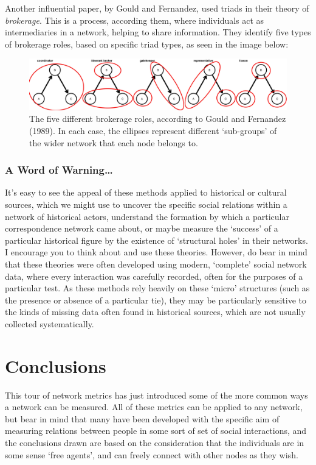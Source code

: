 \documentclass[
]{book}
\begin{document}
Another influential paper, by Gould and Fernandez, used triads in their theory of \emph{brokerage}. This is a process, according them, where individuals act as intermediaries in a network, helping to share information. They identify five types of brokerage roles, based on specific triad types, as seen in the image below:

\begin{figure}
\centering
\includegraphics{images/brokerage_custom.jpg}
\caption{The five different brokerage roles, according to Gould and Fernandez (1989). In each case, the ellipses represent different `sub-groups' of the wider network that each node belongs to.}
\end{figure}

\hypertarget{a-word-of-warning}{%
\subsubsection{A Word of Warning\ldots{}}\label{a-word-of-warning}}

It's easy to see the appeal of these methods applied to historical or cultural sources, which we might use to uncover the specific social relations within a network of historical actors, understand the formation by which a particular correspondence network came about, or maybe measure the `success' of a particular historical figure by the existence of `structural holes' in their networks. I encourage you to think about and use these theories. However, do bear in mind that these theories were often developed using modern, `complete' social network data, where every interaction was carefully recorded, often for the purposes of a particular test. As these methods rely heavily on these `micro' structures (such as the presence or absence of a particular tie), they may be particularly sensitive to the kinds of missing data often found in historical sources, which are not usually collected systematically.

\hypertarget{conclusions}{%
\section{Conclusions}\label{conclusions}}

This tour of network metrics has just introduced some of the more common ways a network can be measured. All of these metrics can be applied to any network, but bear in mind that many have been developed with the specific aim of measuring relations between people in some sort of set of social interactions, and the conclusions drawn are based on the consideration that the individuals are in some sense `free agents', and can freely connect with other nodes as they wish.
\end{document}
